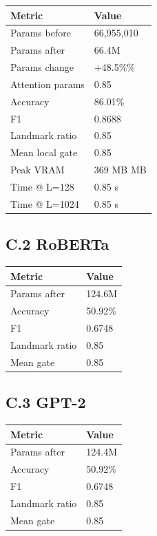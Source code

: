\begin{table}[H]
\centering
\small
\begin{tabular}{ll}
\toprule
\textbf{Metric} & \textbf{Value} \\
\midrule
Params before & 66,955,010 \\
Params after & 66.4M \\
Params change & +48.5\%\% \\
Attention params & 0.85 \\
Accuracy & 86.01\% \\
F1 & 0.8688 \\
Landmark ratio & 0.85 \\
Mean local gate & 0.85 \\
Peak VRAM & 369 MB MB \\
Time @ L=128 & 0.85 s \\
Time @ L=1024 & 0.85 s \\
\bottomrule
\end{tabular}
\end{table}

\subsection{C.2 RoBERTa}

\begin{table}[H]
\centering
\small
\begin{tabular}{ll}
\toprule
\textbf{Metric} & \textbf{Value} \\
\midrule
Params after & 124.6M \\
Accuracy & 50.92\% \\
F1 & 0.6748 \\
Landmark ratio & 0.85 \\
Mean gate & 0.85 \\
\bottomrule
\end{tabular}
\end{table}

\subsection{C.3 GPT-2}

\begin{table}[H]
\centering
\small
\begin{tabular}{ll}
\toprule
\textbf{Metric} & \textbf{Value} \\
\midrule
Params after & 124.4M \\
Accuracy & 50.92\% \\
F1 & 0.6748 \\
Landmark ratio & 0.85 \\
Mean gate & 0.85 \\
\bottomrule
\end{tabular}
\end{table}

